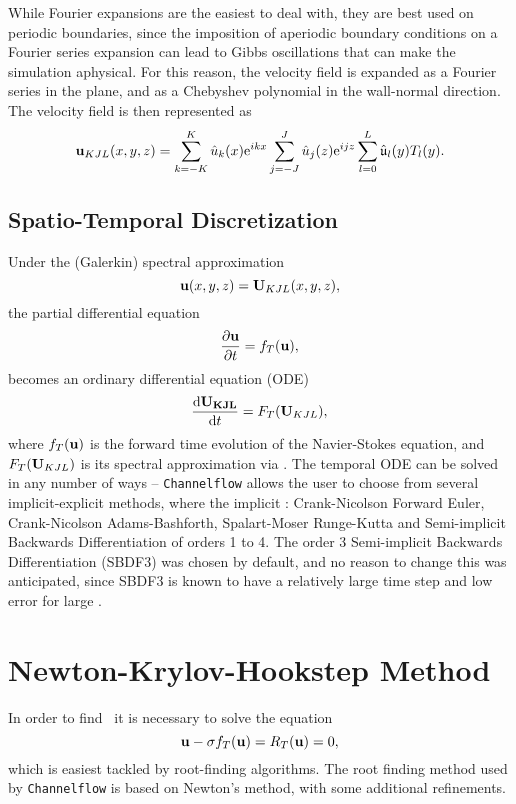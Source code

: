 While Fourier expansions are the easiest to deal with, they are best used on periodic boundaries, since the imposition of aperiodic boundary conditions on a Fourier series expansion can lead to Gibbs oscillations that can make the simulation aphysical. For this reason, the velocity field is expanded as a Fourier series in the plane, and as a Chebyshev polynomial in the wall-normal direction. The velocity field is then represented as 
\begin{equation}
\Vector{u}_{KJL}(x,y,z) = \sum{k=-K}{K}{\hat{u}_k(x)\exp{ikx}}\sum{j=-J}{J}{\hat{u}_j(z)\exp{ijz}}\sum{l=0}{L}{\hat{\mathfrak{u}}_l(y)T_l(y)}.
\end{equation}

\subsection{Spatio-Temporal Discretization} 

Under the (Galerkin) spectral approximation 
\begin{equation}
\mathbf{u}(x,y,z) = \mathbf{U}_{KJL}(x,y,z),
\end{equation}
the partial differential equation
\begin{equation}
\pder{1}{\Vector{u}}{t} = f_T(\Vector{u}),
\end{equation}
becomes an ordinary differential equation (ODE)
\begin{equation}
\der{1}{\Vector{U_{KJL}}}{t} = F_T(\Vector{U}_{KJL}), 
\end{equation}
where $f_T(\mathbf{u})$ is the forward time evolution of the Navier-Stokes equation, and $F_T(\mathbf{U}_{KJL})$ is its spectral approximation via . The temporal ODE can be solved in any number of ways -- {\tt Channelflow} allows the user to choose from several implicit-explicit methods, where the implicit : Crank-Nicolson Forward Euler, Crank-Nicolson Adams-Bashforth, Spalart-Moser Runge-Kutta and Semi-implicit Backwards Differentiation of orders 1 to 4. The order 3 Semi-implicit Backwards Differentiation (SBDF3) was chosen by default, and no reason to change this was anticipated, since SBDF3 is known to have a relatively large time step and low error for large \ReN{}.

\section{Newton-Krylov-Hookstep Method}

In order to find \ecs\, it is necessary to solve the equation
\begin{equation}\label{eq:NRResidual}
\mathbf{u} - \sigma f_T(\mathbf{u}) = R_T(\mathbf{u}) = 0,
\end{equation}
which is easiest tackled by root-finding algorithms. The root finding method used by {\tt Channelflow} is based on Newton's method, with some additional refinements. \\
